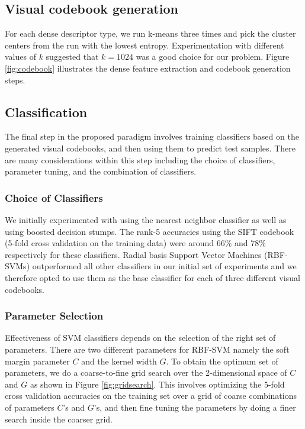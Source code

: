 \documentclass[12pt]{article}
\begin{document}
\subsection{Visual codebook generation}
For each dense descriptor type, we run k-means three times and pick the cluster centers from the run with the lowest entropy.
Experimentation with different values of $k$ suggested that $k=1024$ was a good choice for our problem.
Figure \ref{fig:codebook} illustrates the dense feature extraction and codebook generation steps. 

\subsection{Classification}
The final step in the proposed paradigm involves training classifiers based on the generated visual codebooks, and then using them to predict test samples.
There are many considerations within this step including the choice of classifiers, parameter tuning, and the combination of classifiers.

\subsubsection{Choice of Classifiers}
We initially experimented with using the nearest neighbor classifier as well as using boosted decision stumps.
The rank-5 accuracies using the SIFT codebook (5-fold cross validation on the training data) were around 66\% and 78\% respectively for these classifiers.
Radial basis Support Vector Machines (RBF-SVMs) outperformed all other classifiers in our initial set of experiments and we therefore opted to use them as the base classifier for each of three different visual codebooks.

\subsubsection{Parameter Selection}
Effectiveness of SVM classifiers depends on the selection of the right set of parameters.
There are two different parameters for RBF-SVM namely the soft margin parameter $C$ and the kernel width $G$.
To obtain the optimum set of parameters, we do a coarse-to-fine grid search over the 2-dimensional space of $C$ and $G$ as shown in Figure \ref{fig:gridsearch}.
This involves optimizing the 5-fold cross validation accuracies on the training set over a grid of coarse combinations of parameters $C$'s and $G$'s, and then fine tuning the parameters by doing a finer search inside the coarser grid.
\end{document}
